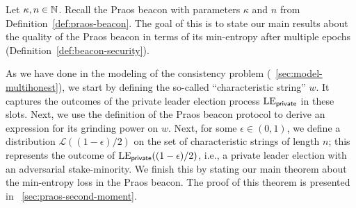 

Let $\kappa, n \in \mathbb{N}$. 
Recall the Praos beacon with parameters $\kappa$ and $n$ from Definition~\ref{def:praos-beacon}. 
The goal of this \Section is to state our main results 
about the quality of the Praos beacon 
in terms of its min-entropy after multiple epochs (Definition~\ref{def:beacon-security}).

As we have done in the modeling of the consistency problem 
(\Section~\ref{sec:model-multihonest}), 
we start by defining the so-called ``characteristic string'' $w$. 
It captures the outcomes of the private leader election process $\mathrm{LE}_\mathsf{private}$ 
in these slots. 
Next, we use the definition of the Praos beacon protocol to 
derive an expression for its grinding power on $w$.
Next, for some $\epsilon \in (0,1)$, 
we define a distribution $\mathcal{L}((1-\epsilon)/2)$ on the set of characteristic strings of length $n$; 
this represents the outcome of $\mathrm{LE}_\mathsf{private}((1-\epsilon)/2)$, i.e., 
a private leader election with an adversarial stake-minority.
We finish this \Section by stating our main theorem about the min-entropy loss in the Praos beacon. 
The proof of this theorem is presented in \Section~\ref{sec:praos-second-moment}.




\newcommand{\Suffix}[2]{ \mathsf{suffix}({#1},{#2})}
\newcommand{\CoinTossingLC}{\Pi_\mathsf{lc}^{\Players(\alpha),k,n}}






